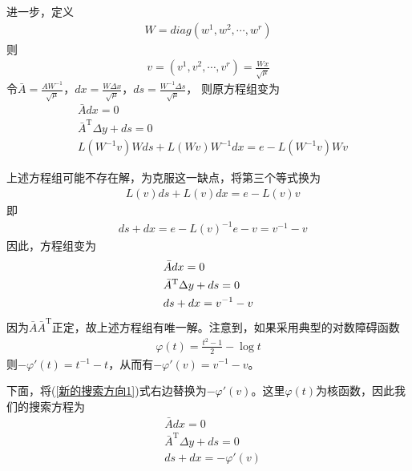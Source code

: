            \par
            进一步，定义
            \begin{align*}
             W=diag(w^1,w^2,\cdots,w^r)
            \end{align*}
            则
            \begin{align*}
             v=(v^1,v^2,\cdots,v^r)=\frac{W x}{\sqrt{\mu}}
            \end{align*}
            令$\bar{A}=\frac{AW^{-1}}{\sqrt{\mu}}$，$dx=\frac{W\Delta x}{\sqrt{\mu}}$，$ds=\frac{W^{-1}\Delta s}{\sqrt{\mu}}$，
            则原方程组变为
            \begin{align*}
            & \bar{A} dx=0\\
            & {\bar{A}}^\mathrm{T}  \Delta y+ds=0\\
            & L(W^{-1}v)Wds+L(Wv)W^{-1}dx=e-L(W^{-1}v)Wv
            \end{align*}
            \par
            上述方程组可能不存在解，为克服这一缺点，将第三个等式换为
            \begin{align*}
            & L(v)ds+L(v)dx=e-L(v)v
            \end{align*}
            即
            \begin{align*}
            & ds+dx=e-L(v)^{-1}e-v=v^{-1}-v
            \end{align*}
            因此，方程组变为
            \begin{align}
            & \bar{A} dx=0\notag \\
            & {\bar{A}}^\mathrm{T}  \Delta y+ds=0\notag \\
            & ds+dx=v^{-1}-v\label{新的搜索方向1}
            \end{align}
            因为$\bar{A}{\bar{A}}^\mathrm{T} $正定，故上述方程组有唯一解。注意到，如果采用典型的对数障碍函数
            \begin{align*}
            \varphi(t)=\frac{t^2-1}{2}-\log t
            \end{align*}
            则$-\varphi'(t) = t^{-1}-t$，从而有$-\varphi'(v) = v^{-1}-v$。
            \par
            下面，将(\ref{新的搜索方向1})式右边替换为$-{\varphi}'(v)$。这里${\varphi}(t)$为核函数，因此我们的搜索方程为
            \begin{align*}
            & \bar{A} dx=0\\
            & {\bar{A}}^\mathrm{T}  \Delta y+ds=0\\
            & ds+dx=-{\varphi}'(v)
            \end{align*}
